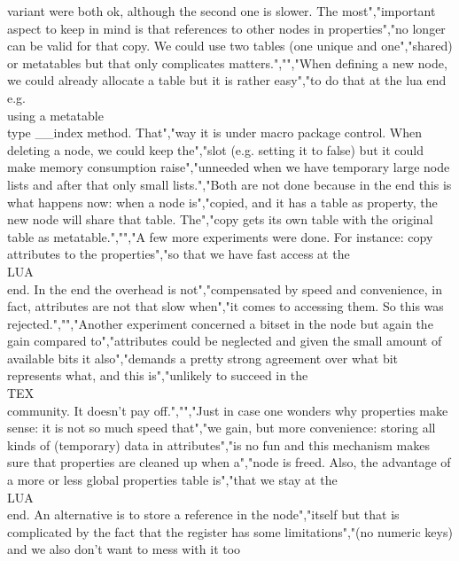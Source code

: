 variant were both ok, although the second one is slower. The most","important aspect to keep in mind is that references to other nodes in properties","no longer can be valid for that copy. We could use two tables (one unique and one","shared) or metatables but that only complicates matters.","","When defining a new node, we could already allocate a table but it is rather easy","to do that at the lua end e.g.\\ using a metatable \\type {__index} method. That","way it is under macro package control. When deleting a node, we could keep the","slot (e.g. setting it to false) but it could make memory consumption raise","unneeded when we have temporary large node lists and after that only small lists.","Both are not done because in the end this is what happens now: when a node is","copied, and it has a table as property, the new node will share that table. The","copy gets its own table with the original table as metatable.","","A few more experiments were done. For instance: copy attributes to the properties","so that we have fast access at the \\LUA\\ end. In the end the overhead is not","compensated by speed and convenience, in fact, attributes are not that slow when","it comes to accessing them. So this was rejected.","","Another experiment concerned a bitset in the node but again the gain compared to","attributes could be neglected and given the small amount of available bits it also","demands a pretty strong agreement over what bit represents what, and this is","unlikely to succeed in the \\TEX\\ community. It doesn't pay off.","","Just in case one wonders why properties make sense: it is not so much speed that","we gain, but more convenience: storing all kinds of (temporary) data in attributes","is no fun and this mechanism makes sure that properties are cleaned up when a","node is freed. Also, the advantage of a more or less global properties table is","that we stay at the \\LUA\\ end. An alternative is to store a reference in the node","itself but that is complicated by the fact that the register has some limitations","(no numeric keys) and we also don't want to mess with it too 